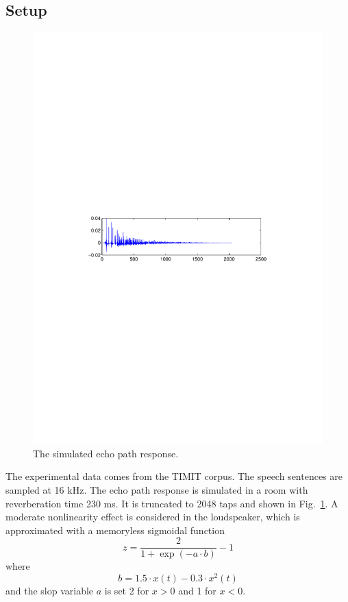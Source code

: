 \documentclass[a4paper]{article}
\begin{document}
\subsection{Setup}

\begin{figure}[t]
  \centering
  \includegraphics[width=\linewidth]{fig3_rir.pdf}
  \caption{The simulated echo path response.}
  \label{fig3}
\end{figure}

The experimental data comes from the TIMIT corpus. The speech sentences are sampled at 16 kHz. The echo path response is simulated in a room with reverberation time 230 ms. It is truncated to 2048 taps and shown in Fig.~\ref{fig3}. A moderate nonlinearity effect is considered in the loudspeaker, which is approximated with a memoryless sigmoidal function~\cite{comminiello2013functional}
\begin{equation}\label{eq:loud}
  z=\frac{2}{1+\exp(-a \cdot b)}-1
\end{equation}
where
\begin{equation}\label{eq:loudnl}
  b=1.5 \cdot x(t)-0.3 \cdot x^2(t)
\end{equation}
and the slop variable $a$ is set 2 for $x>0$ and 1 for $x<0$.
\end{document}
